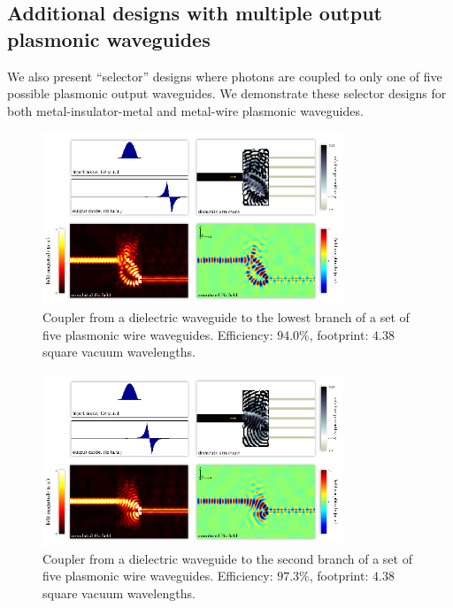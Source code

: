 \documentclass[letterpaper,10pt]{article}
\begin{document}
\begin{appendix}
\section{Additional designs with multiple output plasmonic waveguides}
We also present ``selector'' designs where photons are coupled to 
    only one of five possible plasmonic output waveguides.
We demonstrate these selector designs for both metal-insulator-metal and
    metal-wire plasmonic waveguides.
\begin{figure}[h!]
    \centering
    \includegraphics[width=0.8\textwidth]{16}
    \caption{
        Coupler from a dielectric waveguide to the 
            lowest branch of a set of five plasmonic wire waveguides.
        Efficiency: $94.0\%$,
        footprint: $4.38$ square vacuum wavelengths.
        }
\end{figure}
\begin{figure}[h!]
    \centering
    \includegraphics[width=0.8\textwidth]{17}
    \caption{
        Coupler from a dielectric waveguide to the 
            second branch of a set of five plasmonic wire waveguides.
        Efficiency: $97.3\%$,
        footprint: $4.38$ square vacuum wavelengths.
        }
\end{figure}
\begin{figure}[h!]
    \centering

\end{figure}
\end{appendix}
\end{document}
